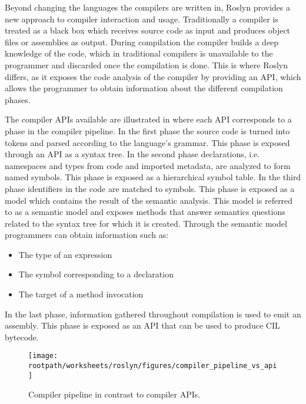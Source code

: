 Beyond changing the languages the compilers are written in, Roslyn provides a new approach to compiler interaction and usage. Traditionally a compiler is treated as a black box which receives source code as input and produces object files or assemblies as output\cite[p. 3]{ng2012roslyn}. During compilation the compiler builds a deep knowledge of the code, which in traditional compilers is unavailable to the programmer and discarded once the compilation is done. This is where Roslyn differs, as it exposes the code analysis of the compiler by providing an \ac{API}, which allows the programmer to obtain information about the different compilation phases\cite[p. 3]{ng2012roslyn}.

The compiler \acp{API} available are illustrated in  where each \ac{API} corresponds to a phase in the compiler pipeline. In the first phase the source code is turned into tokens and parsed according to the language’s grammar. This phase is exposed through an \ac{API} as a syntax tree. In the second phase declarations, i.e. namespaces and types from code and imported metadata, are analyzed to form named symbols. This phase is exposed as a hierarchical symbol table. In the third phase identifiers in the code are matched to symbols. This phase is exposed as a model which contains the result of the semantic analysis. This model is referred to as a semantic model and exposes methods that answer semantics questions related to the syntax tree for which it is created\cite{ng2012roslyn}. Through the semantic model programmers can obtain information such as:
\begin{itemize}
\item The type of an expression
\item The symbol corresponding to a declaration
\item The target of a method invocation
\end{itemize}
In the last phase, information gathered throughout compilation is used to emit an assembly. This phase is exposed as an \ac{API} that can be used to produce \ac{CIL} bytecode\cite[p. 3-4]{ng2012roslyn}.

\begin{figure}[htbp]
\centering
\texttt{[image: \\rootpath/worksheets/roslyn/figures/compiler\_pipeline\_vs\_api]}
\caption{Compiler pipeline in contrast to compiler \acp{API}\cite[p. 4]{ng2012roslyn}.}
\label{fig:api_vs_compiler_pipeline}
\end{figure}

